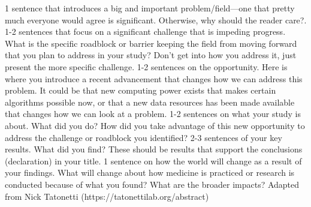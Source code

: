 1 sentence that introduces a big and important problem/field---one that pretty
much everyone would agree is significant. Otherwise, why should the reader
care?. 1-2 sentences that focus on a significant challenge that is impeding
progress. What is the specific roadblock or barrier keeping the field from
moving forward that you plan to address in your study? Don't get into how you
address it, just present the more specific challenge. 1-2 sentences on the
opportunity. Here is where you introduce a recent advancement that changes how
we can address this problem. It could be that new computing power exists that
makes certain algorithms possible now, or that a new data resources has been
made available that changes how we can look at a problem. 1-2 sentences on what
your study is about. What did you do? How did you take advantage of this new
opportunity to address the challenge or roadblock you identified? 2-3 sentences
of your key results. What did you find? These should be results that support the
conclusions (declaration) in your title. 1 sentence on how the world will change
as a result of your findings. What will change about how medicine is practiced
or research is conducted because of what you found? What are the broader
impacts?  Adapted from Nick Tatonetti (https://tatonettilab.org/abstract)

